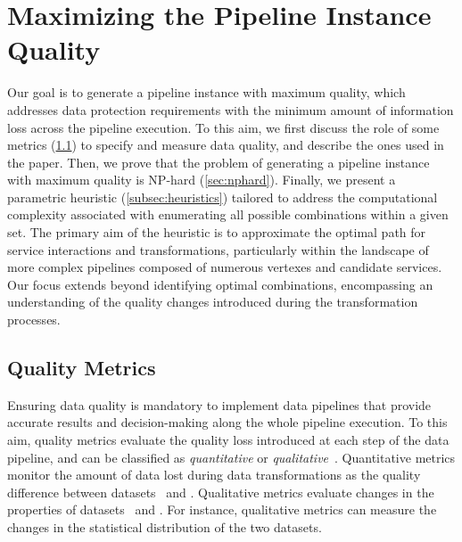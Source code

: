 \section{Maximizing the Pipeline Instance Quality}\label{sec:heuristics}
%
Our goal is to generate a pipeline instance with maximum quality, which addresses data protection requirements with the minimum amount of information loss across the pipeline execution. To this aim, we first discuss the role of some metrics (\cref{subsec:metrics}) to specify and measure data quality, and describe the ones used in the paper.
Then, we prove that the problem of generating a pipeline instance with maximum quality is NP-hard (\cref{sec:nphard}). Finally, we present a parametric heuristic (\cref{subsec:heuristics}) tailored to address the computational complexity associated with enumerating all possible combinations within a given set. The primary aim of the heuristic is to approximate the optimal path for service interactions and transformations, particularly within the landscape of more complex pipelines composed of numerous vertexes and candidate services. Our focus extends beyond identifying optimal combinations, encompassing an understanding of the quality changes introduced during the transformation processes.


\subsection{Quality Metrics}\label{subsec:metrics}
Ensuring data quality is mandatory to implement data pipelines that provide accurate results and decision-making along the whole pipeline execution. To this aim, quality metrics evaluate the quality loss introduced at each step of the data pipeline, and can be classified as \emph{quantitative} or \emph{qualitative}~\cite{ADD}.
Quantitative metrics monitor the amount of data lost during data transformations as the quality difference between datasets \origdataset\ and \transdataset.
Qualitative metrics evaluate changes in the properties of datasets \origdataset\ and \transdataset. For instance, qualitative metrics can measure the changes in the statistical distribution of the two datasets.


